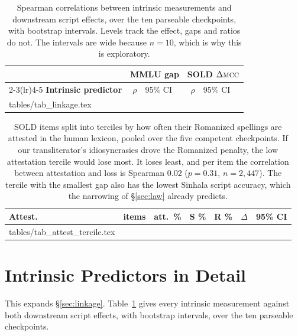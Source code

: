 \documentclass[11pt]{article}
\makeatletter
\newcommand{\mcc}{\textsc{mcc}}
\newcommand{\rows}[1]{\@@input #1 }
\makeatother
\begin{document}
\begin{table}[t]
\centering\scriptsize
\setlength{\tabcolsep}{2pt}
\begin{tabular}{@{}l r@{~}l r@{~}l@{}}
\toprule
& \multicolumn{2}{c}{\textbf{MMLU gap}} & \multicolumn{2}{c}{\textbf{SOLD} $\Delta\mcc$} \\
\cmidrule(lr){2-3}\cmidrule(lr){4-5}
\textbf{Intrinsic predictor} & $\rho$ & 95\% CI & $\rho$ & 95\% CI \\
\midrule
\rows{tables/tab_linkage.tex}
\bottomrule
\end{tabular}
\caption{Spearman correlations between intrinsic measurements and downstream
script effects, over the ten parseable checkpoints, with bootstrap intervals.
Levels track the effect, gaps and ratios do not. The intervals are wide because
$n = 10$, which is why this is exploratory.}
\label{tab:linkage}
\end{table}

\begin{table}[t]
\centering\small
\setlength{\tabcolsep}{2.8pt}
\begin{tabular}{@{}lrr rrr l@{}}
\toprule
\textbf{Attest.} & \textbf{items} & \textbf{att.\ \%}
& \textbf{S \%} & \textbf{R \%} & \boldmath$\Delta$ & \textbf{95\% CI} \\
\midrule
\rows{tables/tab_attest_tercile.tex}
\bottomrule
\end{tabular}
\caption{SOLD items split into terciles by how often their Romanized spellings are
attested in the human lexicon, pooled over the five competent checkpoints. If our
transliterator's idiosyncrasies drove the Romanized penalty, the low attestation
tercile would lose most. It loses least, and per item the correlation between
attestation and loss is Spearman $0.02$ ($p = 0.31$, $n = 2{,}447$). The tercile
with the smallest gap also has the lowest Sinhala script accuracy, which the
narrowing of \S\ref{sec:law} already predicts.}
\label{tab:attesttercile}
\end{table}



\section{Intrinsic Predictors in Detail}
\label{sec:linkagedetail}

This expands \S\ref{sec:linkage}. Table~\ref{tab:linkage} gives every intrinsic
measurement against both downstream script effects, with bootstrap intervals, over the
ten parseable checkpoints.
\end{document}
